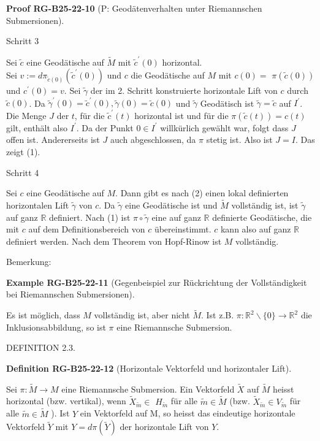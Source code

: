 \documentclass[10pt, letterpaper]{article}
\newcommand{\CustomHeading}[3]{%
  \par\medskip\noindent%
  \textbf{#1 #2} \textnormal{(#3)}.\enskip%
}
\newenvironment{DEF}[2]{\begin{unitbox}\CustomHeading{Definition}{#1}{#2}}{\end{unitbox}}
\newenvironment{EXA}[2]{\begin{unitbox}\CustomHeading{Example}{#1}{#2}}{\end{unitbox}}
\newenvironment{PROOF}[2]{\begin{unitbox}\CustomHeading{Proof}{#1}{#2}}{\end{unitbox}}
\begin{document}
\begin{PROOF}{RG-B25-22-10}{P: Geodätenverhalten unter Riemannschen Submersionen}
Schritt 3

Sei $\tilde{c}$ eine Geodätische auf $\tilde{M}$ mit $\tilde{c}^{\prime}(0)$ horizontal.\\
Sei $v:=d \pi_{\tilde{c}(0)}\left(\tilde{c}^{\prime}(0)\right)$ und $c$ die Geodätische auf $M$ mit $c(0)=$ $\pi(\tilde{c}(0))$ und $c^{\prime}(0)=v$. Sei $\tilde{\gamma}$ der im 2. Schritt konstruierte horizontale Lift von $c$ durch $\tilde{c}(0)$. Da $\tilde{\gamma}^{\prime}(0)=\tilde{c}^{\prime}(0), \tilde{\gamma}(0)=\tilde{c}(0)$ und $\tilde{\gamma}$ Geodätisch ist $\tilde{\gamma}=\tilde{c}$ auf $I^{\prime}$. Die Menge $J$ der $t$, für die $\tilde{c}^{\prime}(t)$ horizontal ist und für die $\pi(\tilde{c}(t))=c(t)$ gilt, enthält also $I^{\prime}$. Da der Punkt $0 \in I^{\prime}$ willkürlich gewählt war, folgt dass $J$ offen ist. Andererseits ist $J$ auch abgeschlossen, da $\pi$ stetig ist. Also ist $J=I$. Das zeigt (1).

Schritt 4

Sei $c$ eine Geodätische auf $M$. Dann gibt es nach (2) einen lokal definierten horizontalen Lift $\tilde{\gamma}$ von $c$. Da $\tilde{\gamma}$ eine Geodätische ist und $\tilde{M}$ vollständig ist, ist $\tilde{\gamma}$ auf ganz $\mathbb{R}$ definiert. Nach (1) ist $\pi \circ \tilde{\gamma}$ eine auf ganz $\mathbb{R}$ definierte Geodätische, die mit $c$ auf dem Definitionsbereich von $c$ übereinstimmt. $c$ kann also auf ganz $\mathbb{R}$ definiert werden. Nach dem Theorem von Hopf-Rinow ist $M$ vollständig.
\end{PROOF}




Bemerkung: 


\begin{EXA}{RG-B25-22-11}{Gegenbeispiel zur Rückrichtung der Vollständigkeit bei Riemannschen Submersionen}
Es ist möglich, dass $M$ vollständig ist, aber nicht $\tilde{M}$. Ist z.B. $\pi: \mathbb{R}^{2} \backslash\{0\} \rightarrow \mathbb{R}^{2}$ die Inklusionsabbildung, so ist $\pi$ eine Riemannsche Submersion.
\end{EXA}

DEFINITION 2.3. 

\begin{DEF}{RG-B25-22-12}{Horizontale Vektorfeld und horizontaler Lift}
Sei $\pi: \tilde{M} \rightarrow M$ eine Riemannsche Submersion. Ein Vektorfeld $\tilde{X}$ auf $\tilde{M}$ heisst horizontal (bzw. vertikal), wenn $\tilde{X}_{\tilde{m}} \in$ $H_{\tilde{m}}$ für alle $\tilde{m} \in \tilde{M}$ (bzw. $\tilde{X}_{\tilde{m}} \in V_{\tilde{m}}$ für alle $\tilde{m} \in \tilde{M}$ ). Ist $Y$ ein Vektorfeld auf M, so heisst das eindeutige horizontale Vektorfeld $\tilde{Y}$ mit $Y=d \pi(\tilde{Y})$ der horizontale Lift von $Y$.
\end{DEF}
\end{document}
